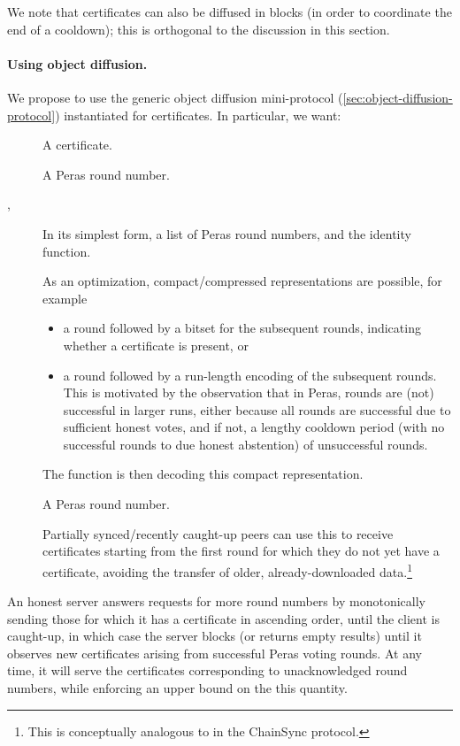 We note that certificates can also be diffused in blocks (in order to coordinate the end of a cooldown); this is orthogonal to the discussion in this section.

\paragraph{Using object diffusion.}

We propose to use the generic object diffusion mini-protocol (\cref{sec:object-diffusion-protocol}) instantiated for certificates.
In particular, we want:

\begin{description}
\item []
  A certificate.
\item []
  A Peras round number.
\item [, ]
  In its simplest form, a list of Peras round numbers, and the identity function.

  As an optimization, compact/compressed representations are possible, for example
  \begin{itemize}
  \item
    a round followed by a bitset for the subsequent rounds, indicating whether a certificate is present, or
  \item
    a round followed by a run-length encoding of the subsequent rounds.
    This is motivated by the observation that in Peras, rounds are (not) successful in larger runs, either because all rounds are successful due to sufficient honest votes, and if not, a lengthy cooldown period (with no successful rounds to due honest abstention) of unsuccessful rounds.
  \end{itemize}
  The  function is then decoding this compact representation.
\item []
  A Peras round number.

  Partially synced/recently caught-up peers can use this to receive certificates starting from the first round for which they do not yet have a certificate, avoiding the transfer of older, already-downloaded data.\footnote{
  This is conceptually analogous to  in the ChainSync protocol.}
\end{description}

An honest server answers requests for more round numbers by monotonically sending those for which it has a certificate in ascending order, until the client is caught-up, in which case the server blocks (or returns empty results) until it observes new certificates arising from successful Peras voting rounds.
At any time, it will serve the certificates corresponding to unacknowledged round numbers, while enforcing an upper bound on the this quantity.

